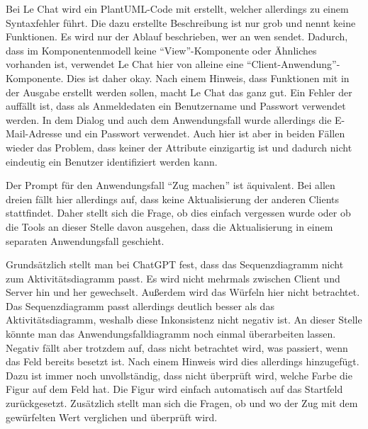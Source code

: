 Bei Le Chat wird ein PlantUML-Code mit erstellt, welcher allerdings zu einem Syntaxfehler führt. Die dazu erstellte Beschreibung ist 
nur grob und nennt keine Funktionen. Es wird nur der Ablauf beschrieben, wer an wen sendet. Dadurch, dass im Komponentenmodell keine 
``View''-Komponente oder Ähnliches vorhanden ist, verwendet Le Chat hier von alleine eine ``Client-Anwendung''-Komponente. Dies ist daher 
okay. Nach einem Hinweis, dass Funktionen mit in der Ausgabe erstellt werden sollen, macht Le Chat das ganz gut. Ein Fehler der 
auffällt ist, dass als Anmeldedaten ein Benutzername und Passwort verwendet werden. In dem Dialog und auch dem Anwendungsfall wurde 
allerdings die E-Mail-Adresse und ein Passwort verwendet. Auch hier ist aber in beiden Fällen wieder das Problem, dass keiner der 
Attribute einzigartig ist und dadurch nicht eindeutig ein Benutzer identifiziert werden kann.

Der Prompt für den Anwendungsfall ``Zug machen'' ist äquivalent. Bei allen dreien fällt hier allerdings auf, dass keine Aktualisierung 
der anderen Clients stattfindet. Daher stellt sich die Frage, ob dies einfach vergessen wurde oder ob die Tools an dieser Stelle davon 
ausgehen, dass die Aktualisierung in einem separaten Anwendungsfall geschieht.

Grundsätzlich stellt man bei ChatGPT fest, dass das Sequenzdiagramm nicht zum Aktivitätsdiagramm passt. Es wird nicht mehrmals 
zwischen Client und Server hin und her gewechselt. Außerdem wird das Würfeln hier nicht betrachtet. Das Sequenzdiagramm passt 
allerdings deutlich besser als das Aktivitätsdiagramm, weshalb diese Inkonsistenz nicht negativ ist. An dieser Stelle könnte man das 
Anwendungsfalldiagramm noch einmal überarbeiten lassen. Negativ fällt aber trotzdem auf, dass nicht betrachtet wird, was passiert, 
wenn das Feld bereits besetzt ist. Nach einem Hinweis wird dies allerdings hinzugefügt. Dazu ist immer noch unvollständig, dass nicht 
überprüft wird, welche Farbe die Figur auf dem Feld hat. Die Figur wird einfach automatisch auf das Startfeld zurückgesetzt. 
Zusätzlich stellt man sich die Fragen, ob und wo der Zug mit dem gewürfelten Wert verglichen und überprüft wird. 

